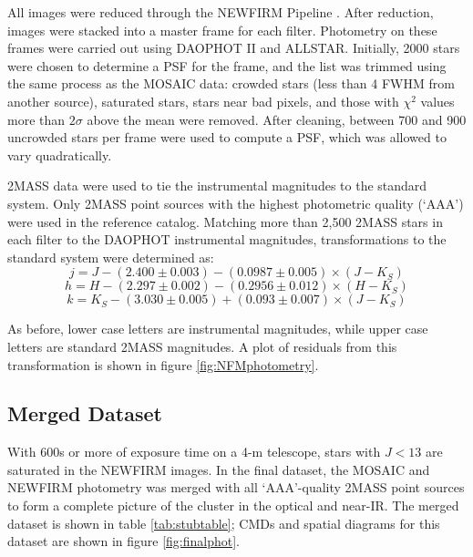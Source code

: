 \documentclass[iop]{emulateapj}
\begin{document}
All images were reduced through the NEWFIRM Pipeline \citep{2009ASPC..411..506S}. After reduction, images were stacked into a master frame for each filter. Photometry on these frames were carried out using DAOPHOT II and ALLSTAR. Initially, 2000 stars were chosen to determine a PSF for the frame, and the list was trimmed using the same process as the MOSAIC data: crowded stars (less than 4 FWHM from another source), saturated stars, stars near bad pixels, and those with $\chi^2$ values more than $2\sigma$ above the mean were removed. After cleaning, between 700 and 900 uncrowded stars per frame were used to compute a PSF, which was allowed to vary quadratically.

2MASS data were used to tie the instrumental magnitudes to the standard system. Only 2MASS point sources with the highest photometric quality (`AAA') were used in the reference catalog. Matching more than 2,500 2MASS stars in each filter to the DAOPHOT instrumental magnitudes, transformations to the standard system were determined as:
\begin{equation} \label{eq:Jtrans}
	j = J - (2.400 \pm 0.003) - (0.0987 \pm 0.005) \times ( J-K_S)
\end{equation}
\begin{equation} \label{eq:Htrans}
	h = H - (2.297 \pm 0.002) - (0.2956 \pm 0.012) \times ( H-K_S)
\end{equation}
\begin{equation} \label{eq:Ktrans}
	k = K_S - (3.030 \pm 0.005) + (0.093 \pm 0.007) \times ( J-K_S)
\end{equation}

As before, lower case letters are instrumental magnitudes, while upper case letters are standard 2MASS magnitudes. A plot of residuals from this transformation is shown in figure \ref{fig:NFMphotometry}.



\subsection{Merged Dataset}
With 600s or more of exposure time on a 4-m telescope, stars with $J < 13$ are saturated in the NEWFIRM images. In the final dataset, the MOSAIC and NEWFIRM photometry was merged with all `AAA'-quality 2MASS point sources to form a complete picture of the cluster in the optical and near-IR. The merged dataset is shown in table \ref{tab:stubtable}; CMDs and spatial diagrams for this dataset are shown in figure \ref{fig:finalphot}.
\end{document}
